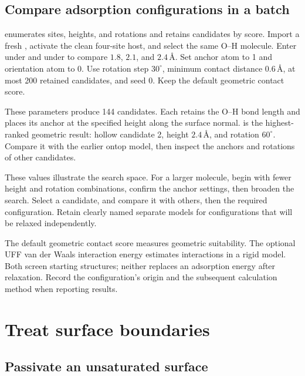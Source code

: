 \subsection{Compare adsorption configurations in a batch}

 enumerates sites, heights, and rotations and retains candidates by score. Import a fresh , activate the clean four-site host, and select the same O--H molecule. Enter  under  and  under  to compare $1.8$, $2.1$, and $2.4\,\text{\AA}$. Set anchor atom to 1 and orientation atom to 0. Use rotation step $30^\circ$, minimum contact distance $0.6\,\text{\AA}$, at most 200 retained candidates, and seed 0. Keep the default geometric contact score.

These parameters produce 144 candidates. Each retains the O--H bond length and places its anchor at the specified height along the surface normal.  is the highest-ranked geometric result: hollow candidate 2, height $2.4\,\text{\AA}$, and rotation $60^\circ$. Compare it with the earlier ontop model, then inspect the anchors and rotations of other candidates.

These values illustrate the search space. For a larger molecule, begin with fewer height and rotation combinations, confirm the anchor settings, then broaden the search. Select a candidate,  and compare it with others, then  the required configuration. Retain clearly named separate models for configurations that will be relaxed independently.

The default geometric contact score measures geometric suitability. The optional UFF van der Waals interaction energy estimates interactions in a rigid model. Both screen starting structures; neither replaces an adsorption energy after relaxation. Record the configuration's origin and the subsequent calculation method when reporting results.

\section{Treat surface boundaries}

\subsection{Passivate an unsaturated surface}

